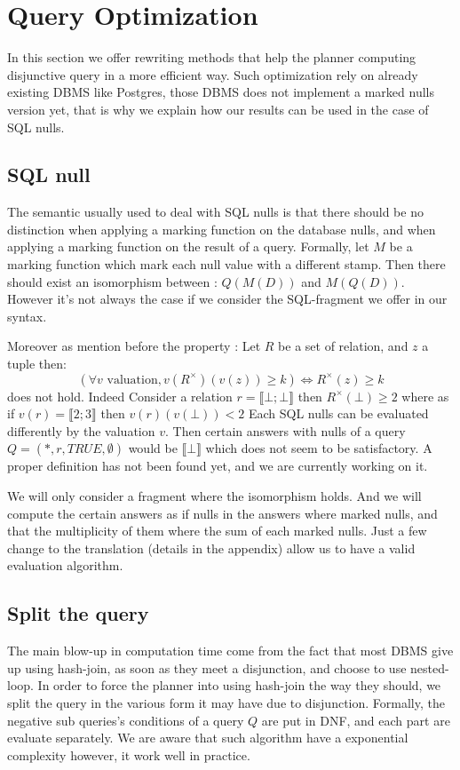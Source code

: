 \section{Query Optimization}
\label{opti}
In this section we offer rewriting methods that help the planner computing disjunctive query in a more efficient way. Such optimization rely on already existing DBMS like Postgres, those DBMS does not implement a marked nulls version yet, that is why we explain how our results can be used in the case of SQL nulls.
 
\subsection{SQL null}
The semantic usually used to deal with SQL nulls is that there should be no distinction when applying a marking function on the database nulls, and when applying a marking function on the result of a query.
Formally, let $M$ be a marking function which mark each null value with a different stamp. 
Then there should exist an isomorphism between : $Q(M(D))$ and $M(Q(D))$. However it's not always the case if we consider the SQL-fragment we offer in our syntax. 

Moreover as mention before the property :
Let $R$ be a set of relation, and $z$ a tuple then:
$$(\forall v \mbox{ valuation}, v(R^\times)(v(z)) \geq k )\Leftrightarrow R^\times(z) \geq k  $$ 
does not hold. Indeed Consider a relation $r = \llbracket \bot;\bot \rrbracket$ then $R^\times(\bot) \geq 2$ where as if $v(r) = \llbracket 2;3 \rrbracket $ then $v(r)(v(\bot)) < 2$
Each SQL nulls can be evaluated differently by the valuation $v$.
Then certain answers with nulls of a query $Q = (*,r,TRUE,\emptyset)$ would be $\llbracket \bot \rrbracket$ which does not seem to be satisfactory. A proper definition has not been found yet, and we are currently working on it.

We will only consider a fragment where the isomorphism holds. And we will compute the certain answers as if nulls in the answers where marked nulls, and that the multiplicity of them where the sum of each marked nulls.
Just a few change to the translation (details in the appendix) allow us to have a valid evaluation algorithm.

\subsection{Split the query}
The main blow-up in computation time come from the fact that most DBMS give up using hash-join, as soon as they meet a disjunction, and choose to use nested-loop.
In order to force the planner into using hash-join the way they should, we split the query in the various form it may have due to disjunction. Formally, the negative sub queries's conditions of a query $Q$ are put in DNF, and each part are evaluate separately. We are aware that such algorithm have a exponential complexity however, it work well in practice.


